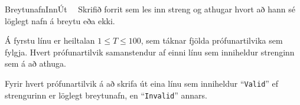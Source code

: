 \begin{problem}{Breytunafn}{Inn}{Út}{~}{~}
	Skrifið forrit sem les inn streng og athugar hvort að hann sé löglegt nafn á breytu eða ekki.

	\Input
		Á fyrstu línu er heiltalan $1 \leq T \leq 100$, sem táknar fjölda prófunartilvika sem fylgja. Hvert prófunartilvik samanstendur af einni línu sem inniheldur strenginn sem á að athuga.

	\Output
		Fyrir hvert prófunartilvik á að skrifa út eina línu sem inniheldur "`\texttt{Valid}"' ef strengurinn er löglegt breytunafn, en "`\texttt{Invalid}"' annars.

	\Examples

		\begin{example}
		\end{example}

\end{problem}